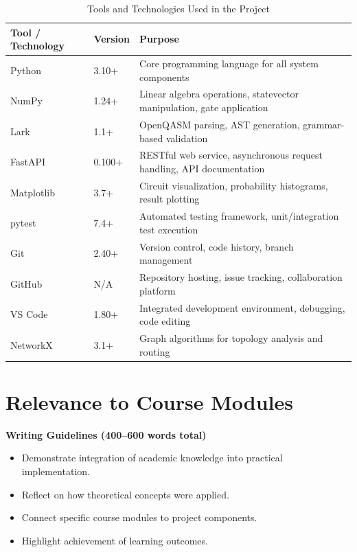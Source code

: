 \begin{table}[h!]
\centering
\caption{Tools and Technologies Used in the Project}
\renewcommand{\arraystretch}{1.3}
\begin{tabularx}{\textwidth}{|p{4cm}|p{3cm}|X|}
\hline
\textbf{Tool / Technology} & \textbf{Version} & \textbf{Purpose} \\
\hline
Python & 3.10+ & Core programming language for all system components \\
\hline
NumPy & 1.24+ & Linear algebra operations, statevector manipulation, gate application \\
\hline
Lark & 1.1+ & OpenQASM parsing, AST generation, grammar-based validation \\
\hline
FastAPI & 0.100+ & RESTful web service, asynchronous request handling, API documentation \\
\hline
Matplotlib & 3.7+ & Circuit visualization, probability histograms, result plotting \\
\hline
pytest & 7.4+ & Automated testing framework, unit/integration test execution \\
\hline
Git & 2.40+ & Version control, code history, branch management \\
\hline
GitHub & N/A & Repository hosting, issue tracking, collaboration platform \\
\hline
VS Code & 1.80+ & Integrated development environment, debugging, code editing \\
\hline
NetworkX & 3.1+ & Graph algorithms for topology analysis and routing \\
\hline
\end{tabularx}
\end{table}





\section{Relevance to Course Modules}

\textbf{Writing Guidelines (400–600 words total)}

\begin{itemize}
    \item Demonstrate integration of academic knowledge into practical implementation.
    \item Reflect on how theoretical concepts were applied.
    \item Connect specific course modules to project components.
    \item Highlight achievement of learning outcomes.
\end{itemize}


